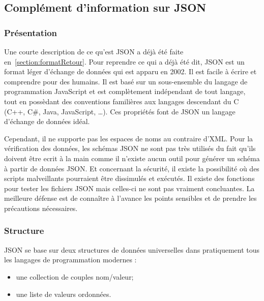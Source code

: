 \subsection{Compl\'ement d'information sur JSON}

\subsubsection{Pr\'esentation}

Une courte description de ce qu'est JSON a d\'ej\`a \'et\'e faite en~\ref{section:formatRetour}.
Pour reprendre ce qui a d\'ej\`a \'et\'e dit, JSON est un format l\'eger d'\'echange de donn\'ees qui est apparu en 2002.
Il est facile \`a \'ecrire et comprendre pour des humains.
Il est bas\'e sur un sous-ensemble du langage de programmation JavaScript et est compl\`etement ind\'ependant de tout langage, tout en poss\`edant des conventions famili\`eres aux langages descendant du C (C++, C\#, Java, JavaScript, \ldots).
Ces propri\'et\'es font de JSON un langage d'\'echange de donn\'ees id\'eal.

Cependant, il ne supporte pas les espaces de noms au contraire d'XML.
Pour la v\'erification des donn\'ees, les sch\'emas JSON ne sont pas tr\`es utilis\'es du fait qu'ils doivent \^etre ecrit \`a la main comme il n'existe aucun outil pour g\'en\'erer un sch\'ema \`a partir de donn\'ees JSON.
Et concernant la s\'ecurit\'e, il existe la possibilit\'e o\`u des scripts malveillants pourraient \^etre dissimul\'es et ex\'ecut\'es.
Il existe des fonctions pour tester les fichiers JSON mais celles-ci ne sont pas vraiment concluantes.
La meilleure d\'efense est de conna\^itre \`a l'avance les points sensibles et de prendre les pr\'ecautions n\'ecessaires.

\subsubsection{Structure}

JSON se base sur deux structures de donn\'ees universelles dans pratiquement tous les langages de programmation modernes :

\begin{itemize}
	\item une collection de couples nom/valeur;
	\item une liste de valeurs ordonn\'ees.

\end{itemize}

\vspace{0.20cm}

